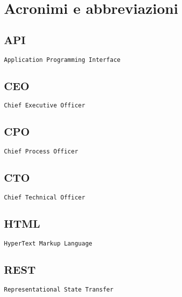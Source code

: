\chapter{Acronimi e abbreviazioni}

\section*{API}

\texttt{Application Programming Interface}

\section*{CEO}

\texttt{Chief Executive Officer}

\section*{CPO}

\texttt{Chief Process Officer}

\section*{CTO}

\texttt{Chief Technical Officer}

\section*{HTML}

\texttt{HyperText Markup Language}

\section*{REST}

\texttt{Representational State Transfer}
